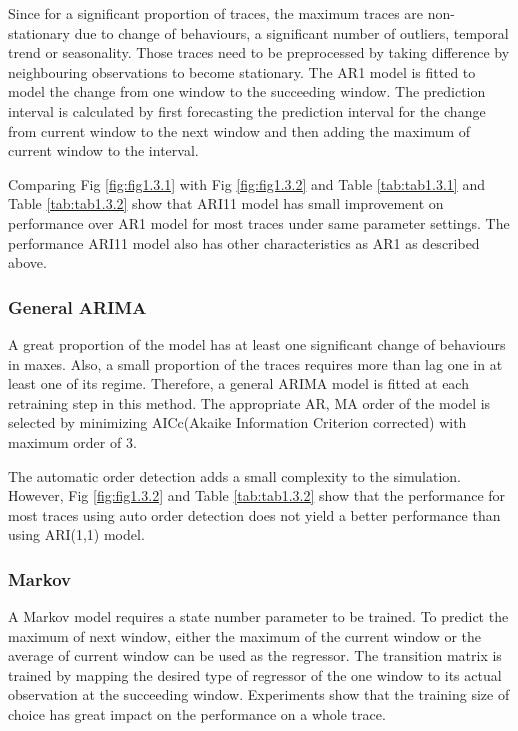 \documentclass{article}
\begin{document}
\begin{flushleft}
Since for a significant proportion of traces, the maximum traces are non-stationary due to change of behaviours, a significant number of outliers, temporal trend or seasonality. Those traces need to be preprocessed by taking difference by neighbouring observations to become stationary. The AR1 model is fitted to model the change from one window to the succeeding window. The prediction interval is calculated by first forecasting the prediction interval for the change from current window to the next window and then adding the maximum of current window to the interval.

Comparing Fig \ref{fig:fig1.3.1} with Fig \ref{fig:fig1.3.2} and Table \ref{tab:tab1.3.1} and Table \ref{tab:tab1.3.2} show that ARI11 model has small improvement on performance over AR1 model for most traces under same parameter settings. The performance ARI11 model also has other characteristics as AR1 as described above.
\end{flushleft}

\subsubsection{General ARIMA}

\begin{flushleft}
A great proportion of the model has at least one significant change of behaviours in maxes. Also, a small proportion of the traces requires more than lag one in at least one of its regime. Therefore, a general ARIMA model is fitted at each retraining step in this method. The appropriate AR, MA order of the model is selected by minimizing AICc(Akaike Information Criterion corrected) with maximum order of 3. 

The automatic order detection adds a small complexity to the simulation. However, Fig \ref{fig:fig1.3.2} and Table \ref{tab:tab1.3.2} show that the performance for most traces using auto order detection does not yield a better performance than using ARI(1,1) model.
\end{flushleft}

\subsubsection{Markov}

\begin{flushleft}
A Markov model requires a state number parameter to be trained. To predict the maximum of next window, either the maximum of the current window or the average of current window can be used as the regressor. The transition matrix is trained by mapping the desired type of regressor of the one window to its actual observation at the succeeding window. Experiments show that the training size of choice has great impact on the performance on a whole trace.
\end{flushleft}
\end{document}
